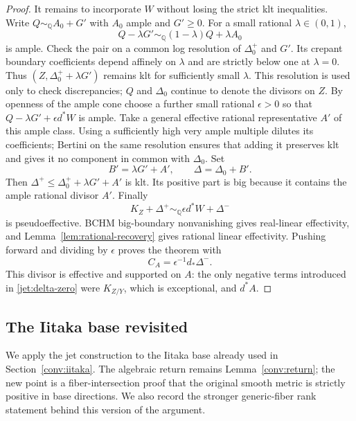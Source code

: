 \begin{proof}
It remains to incorporate $W$ without losing the strict klt inequalities.
Write $Q\sim_{\mathbb Q}A_0+G'$ with $A_0$ ample and $G'\geq0$.
For a small rational $\lambda\in(0,1)$,
\[
 Q-\lambda G'\sim_{\mathbb Q}(1-\lambda)Q+\lambda A_0
\]
is ample.  Check the pair on a common log resolution of $\Delta_0^+$ and
$G'$.  Its crepant boundary coefficients depend affinely on $\lambda$
and are strictly below one at $\lambda=0$.  Thus
$(Z,\Delta_0^++\lambda G')$ remains klt for sufficiently small
$\lambda$.  This resolution is used only to check discrepancies;
$Q$ and $\Delta_0$ continue to denote the divisors on $Z$.  By openness of the ample cone choose a further
small rational $\epsilon>0$ so that
$Q-\lambda G'+\epsilon d^*W$ is ample.
Take a general effective rational representative $A'$ of this ample
class.  Using a sufficiently high very ample multiple dilutes its
coefficients; Bertini on the same resolution ensures that adding it
preserves klt and gives it no component in common with $\Delta_0$.
Set
\[
 B'=\lambda G'+A',\qquad \Delta=\Delta_0+B'.
\]
Then $\Delta^+\leq\Delta_0^++\lambda G'+A'$ is klt.  Its positive
part is big because it contains the ample rational divisor $A'$.
Finally
\[
 K_Z+\Delta^+\sim_{\mathbb Q}\epsilon d^*W+\Delta^-
\]
is pseudoeffective.  BCHM big-boundary nonvanishing
\cite[Theorem~D]{BCHM2010} gives real-linear effectivity, and
Lemma~\ref{lem:rational-recovery} gives rational linear effectivity.
Pushing forward and dividing by $\epsilon$ proves the theorem with
\[
 C_A=\epsilon^{-1}d_*\Delta^-.
\]
This divisor is effective and supported on $A$: the only negative
terms introduced in \eqref{jet:delta-zero} were $K_{Z/Y}$, which is
exceptional, and $d^*A$.
\end{proof}

\subsection{The Iitaka base revisited}

We apply the jet construction to the Iitaka base already used in
Section~\ref{conv:iitaka}.  The algebraic return remains
Lemma~\ref{conv:return}; the new point is a fiber-intersection proof
that the original smooth metric is strictly positive in base directions.
We also record the stronger generic-fiber rank statement behind this
version of the argument.


